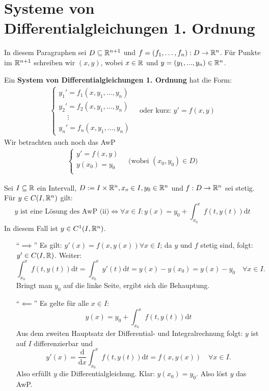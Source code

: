 \documentclass[a4paper,twoside,DIV15,BCOR12mm,chapterprefix=true,headings=twolinechapter]{scrbook}
\begin{document}
\chapter{Systeme von Differentialgleichungen 1. Ordnung}

In diesem Paragraphen sei $D \subseteq \mathbb{R}^{n+1}$ und $f = (f_1, \ldots, f_n): D \to \mathbb{R}^n$. Für Punkte im $\mathbb{R}^{n+1}$ schreiben wir $(x,y)$, wobei $x \in \mathbb{R}$ und $y = (y_1,...,y_n) \in \mathbb{R}^n$.

\begin{definition}
Ein \textbf{System von Differentialgleichungen 1. Ordnung} hat die Form:
\begin{align*}
\begin{cases}
y_1'=f_1(x, y_1, \ldots, y_n)\\
y_2'=f_2(x, y_1, \ldots, y_n)\\
\quad\ \vdots\\
y_n'=f_n(x, y_1, \ldots, y_n)
\end{cases}
\tag{i}
\quad\text{oder kurz: } y'=f(x,y)
\end{align*}
Wir betrachten auch noch das AwP
\begin{align*}
\begin{cases}
y'=f(x,y)\\
y(x_0) = y_0\\
\end{cases}
\tag{ii}
\quad\text{(wobei } (x_0, y_0) \in D)
\end{align*}
\end{definition}

\begin{satz}
Sei $I \subseteq \mathbb{R}$ ein Intervall, $D := I \times \mathbb{R}^n, x_o\in I, y_0\in \mathbb{R}^n$ und $f:D\to\mathbb{R}^n$ sei stetig. Für $y\in C(I,\mathbb{R}^n)$ gilt:
\[\text{$y$ ist eine Lösung des AwP (ii)} \iff  \forall x\in I:y(x) = y_0 + \int_{x_0}^x f(t, y(t)) \text{d}t \]
In diesem Fall ist $y \in C^1(I, \mathbb{R}^n)$.
\end{satz}

\begin{beweis}
\begin{enumerate}
\item["`$\implies$"'] Es gilt: $y'(x) = f(x, y(x)) \forall x\in I$; da $y$ und $f$ stetig sind, folgt: $y' \in C(I,\mathbb{R} )$. Weiter:
\[\int_{x_0}^x f(t,y(t)) \text{d}t = \int_{x_0}^x y'(t)\text{d}t = y(x) - y(x_0) = y(x) - y_0 \quad \forall x\in I.\]
Bringt man $y_0$ auf die linke Seite, ergibt sich die Behauptung.
\item["`$\impliedby$"'] Es gelte für alle $x\in I$:
\[y(x) = y_0  + \int_{x_0}^x f(t, y(t))\text{d}t\]
Aus dem zweiten Hauptsatz der Differential- und Integralrechnung folgt: $y$ ist auf $I$ differenzierbar und 
\[ y'(x) = \frac{\text{d}}{\text{d}x} \int_{x_0}^x f(t, y(t))\text{d}t = f(x, y(x)) \quad \forall x \in I. \]
Also erfüllt $y$ die Differentialgleichung.
Klar: $y(x_0) = y_0$. Also löst $y$ das AwP.
\end{enumerate}
\end{beweis}
\end{document}
